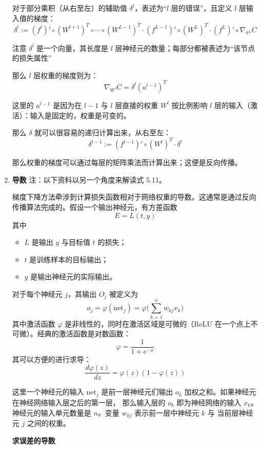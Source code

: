 \documentclass[../studies-ml.tex]{subfiles}
\begin{document}
\begin{enumerate}[I]
        对于部分乘积（从右至左）的辅助值 $\delta^l$，表述为“$l$ 层的错误”，且定义 $l$ 层输入值的梯度：
        \[
          \delta^l := (f^l)' \circ (W^{l+1})^T \circ \cdots \circ (W^{L-1})^T \cdot (f^{L-1})' \circ (W^L)^T
          \cdot (f^L)' \circ \nabla_{a^L} C
        \]

        注意 $\delta^l$ 是一个向量，其长度是 $l$ 层神经元的数量；每部分都被表述为“该节点的损失属性”

        那么 $l$ 层权重的梯度则为：
        \[ \nabla_{W^l} C = \delta^l (a^{l-1})^T \]

        这里的 $a^{l-1}$ 是因为在 $l-1$ 与 $l$ 层直接的权重 $W^l$ 按比例影响 $l$ 层的输入（激活）：输入是固定的，权重是可变的。

        那么 $\delta$ 就可以很容易的递归计算出来，从右至左：
        \[ \delta^{l-1} := (f^{l-1})' \circ (W^l)^T \cdot \delta^l \]

        那么权重的梯度可以通过每层的矩阵乘法而计算出来；这便是反向传播。

  \item \textbf{导数}
        注：以下资料以另一个角度来解读式 5.11。

        梯度下降方法牵涉到计算损失函数相对于网络权重的导数。这通常是通过反向传播算法完成的。假设一个输出神经元，有方差函数
        \[ E = L(t, y) \]
        其中
        \begin{itemize}
          \item $L$ 是输出 $y$ 与目标值 $t$ 的损失；
          \item $t$ 是训练样本的目标输出；
          \item $y$ 是输出神经元的实际输出。
        \end{itemize}

        对于每个神经元 $j$，其输出 $O_j$ 被定义为
        \[ o_j = \varphi(\mathrm{net}_j) = \varphi \Biggl(\sum_{k=1}^{n} w_{kj} x_k\Biggr) \]
        其中激活函数 $\varphi$ 是非线性的，同时在激活区域是可微的（ReLU 在一个点上不可微）。经典的激活函数是对数函数：
        \[ \varphi = \frac{1}{1 + e^{-x}} \]
        其可以方便的进行求导：
        \[ \frac{d \varphi(z)}{dz} = \varphi(z)(1 - \varphi(z)) \]

        这里一个神经元的输入 $\mathrm{net}_j$ 是前一层神经元们输出 $o_k$ 加权之和。如果神经元在神经网络输入层之后的第一层，
        那么输入层的 $o_k$ 即为神经网络的输入 $x_k$。神经元的输入单元数量是 $n$。变量 $w_{kj}$ 表示前一层中神经元 $k$ 与
        当前层神经元 $j$ 之间的权重。

        \textbf{求误差的导数}


\end{enumerate}
\end{document}
